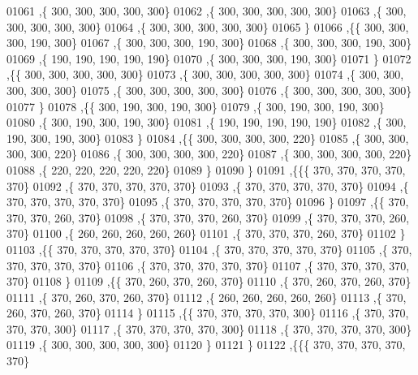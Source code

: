 \begin{DoxyCode}
01061    ,\{   300,   300,   300,   300,   300\}
01062    ,\{   300,   300,   300,   300,   300\}
01063    ,\{   300,   300,   300,   300,   300\}
01064    ,\{   300,   300,   300,   300,   300\}
01065    \}
01066   ,\{\{   300,   300,   300,   190,   300\}
01067    ,\{   300,   300,   300,   190,   300\}
01068    ,\{   300,   300,   300,   190,   300\}
01069    ,\{   190,   190,   190,   190,   190\}
01070    ,\{   300,   300,   300,   190,   300\}
01071    \}
01072   ,\{\{   300,   300,   300,   300,   300\}
01073    ,\{   300,   300,   300,   300,   300\}
01074    ,\{   300,   300,   300,   300,   300\}
01075    ,\{   300,   300,   300,   300,   300\}
01076    ,\{   300,   300,   300,   300,   300\}
01077    \}
01078   ,\{\{   300,   190,   300,   190,   300\}
01079    ,\{   300,   190,   300,   190,   300\}
01080    ,\{   300,   190,   300,   190,   300\}
01081    ,\{   190,   190,   190,   190,   190\}
01082    ,\{   300,   190,   300,   190,   300\}
01083    \}
01084   ,\{\{   300,   300,   300,   300,   220\}
01085    ,\{   300,   300,   300,   300,   220\}
01086    ,\{   300,   300,   300,   300,   220\}
01087    ,\{   300,   300,   300,   300,   220\}
01088    ,\{   220,   220,   220,   220,   220\}
01089    \}
01090   \}
01091  ,\{\{\{   370,   370,   370,   370,   370\}
01092    ,\{   370,   370,   370,   370,   370\}
01093    ,\{   370,   370,   370,   370,   370\}
01094    ,\{   370,   370,   370,   370,   370\}
01095    ,\{   370,   370,   370,   370,   370\}
01096    \}
01097   ,\{\{   370,   370,   370,   260,   370\}
01098    ,\{   370,   370,   370,   260,   370\}
01099    ,\{   370,   370,   370,   260,   370\}
01100    ,\{   260,   260,   260,   260,   260\}
01101    ,\{   370,   370,   370,   260,   370\}
01102    \}
01103   ,\{\{   370,   370,   370,   370,   370\}
01104    ,\{   370,   370,   370,   370,   370\}
01105    ,\{   370,   370,   370,   370,   370\}
01106    ,\{   370,   370,   370,   370,   370\}
01107    ,\{   370,   370,   370,   370,   370\}
01108    \}
01109   ,\{\{   370,   260,   370,   260,   370\}
01110    ,\{   370,   260,   370,   260,   370\}
01111    ,\{   370,   260,   370,   260,   370\}
01112    ,\{   260,   260,   260,   260,   260\}
01113    ,\{   370,   260,   370,   260,   370\}
01114    \}
01115   ,\{\{   370,   370,   370,   370,   300\}
01116    ,\{   370,   370,   370,   370,   300\}
01117    ,\{   370,   370,   370,   370,   300\}
01118    ,\{   370,   370,   370,   370,   300\}
01119    ,\{   300,   300,   300,   300,   300\}
01120    \}
01121   \}
01122  ,\{\{\{   370,   370,   370,   370,   370\}

\end{DoxyCode}
